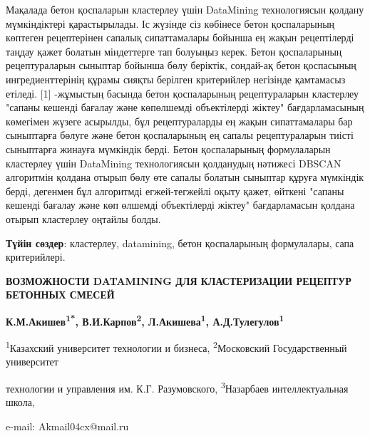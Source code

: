 Мақалада бетон қоспаларын кластерлеу үшін DataMining технологиясын
қолдану мүмкіндіктері қарастырылады. Іс жүзінде сіз көбінесе бетон
қоспаларының көптеген рецептерінен сапалық сипаттамалары бойынша ең
жақын рецептілерді таңдау қажет болатын міндеттерге тап болуыңыз керек.
Бетон қоспаларының рецептураларын сыныптар бойынша бөлу беріктік,
сондай-ақ бетон қоспасының ингредиенттерінің құрамы сияқты берілген
критерийлер негізінде қамтамасыз етіледі. {[}1{]} -жұмыстың басында
бетон қоспаларының рецептураларын кластерлеу "сапаны кешенді бағалау
және көпөлшемді объектілерді жіктеу" бағдарламасының көмегімен жүзеге
асырылды, бұл рецептураларды ең жақын сипаттамалары бар сыныптарға
бөлуге және бетон қоспаларының ең сапалы рецептураларын тиісті
сыныптарға жинауға мүмкіндік берді. Бетон қоспаларының формулаларын
кластерлеу үшін DataMining технологиясын қолданудың нәтижесі DBSCAN
алгоритмін қолдана отырып бөлу өте сапалы болатын сыныптар құруға
мүмкіндік берді, дегенмен бұл алгоритмді егжей-тегжейлі оқыту қажет,
өйткені "сапаны кешенді бағалау және көп өлшемді объектілерді жіктеу"
бағдарламасын қолдана отырып кластерлеу оңтайлы болды.

{\bfseries Түйін сөздер}: кластерлеу, datamining, бетон қоспаларының
формулалары, сапа критерийлері.

\begin{center}
{\large\bfseries ВОЗМОЖНОСТИ DATAMINING ДЛЯ КЛАСТЕРИЗАЦИИ РЕЦЕПТУР БЕТОННЫХ
СМЕСЕЙ}

\vspace{1em}
{\bfseries К.М.Акишев\textsuperscript{1*}, В.И.Карпов\textsuperscript{2},
Л.Акишева\textsuperscript{1}, А.Д.Тулегулов\textsuperscript{1}}

\textsuperscript{1}Казахский университет технологии и бизнеса,
\textsuperscript{2}Московский Государственный университет

технологии и управления им. К.Г. Разумовского,
\textsuperscript{3}Назарбаев интеллектуальная школа,

e-mail: Akmail04cx@mail.ru
\end{center}

